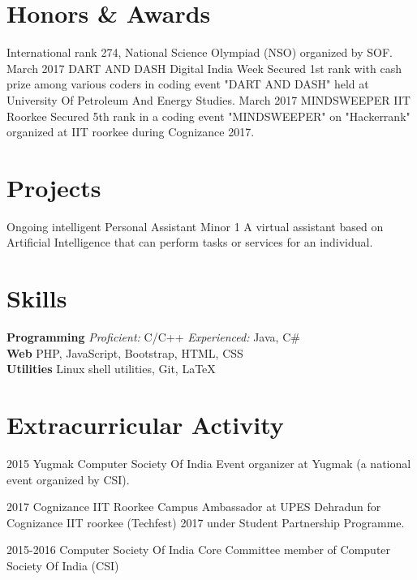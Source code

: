 \documentclass[]{friggeri-cv}
\begin{document}
\section{Honors \& Awards}

\begin{entrylist}
  \entry
    {}
    {International rank 274, \normalfont National Science Olympiad (NSO) organized by SOF.}
    {}
    {}
  \entry
    {March 2017}
    {DART AND DASH}
    {Digital India Week}
    {Secured 1st rank with cash prize among various coders in coding event "DART AND DASH" held at University Of Petroleum And Energy Studies.}
  \entry
    {March 2017}
    {MINDSWEEPER}
    {IIT Roorkee}
    {Secured 5th rank in a coding event "MINDSWEEPER" on "Hackerrank" organized at IIT roorkee during Cognizance 2017.}
    
\end{entrylist}

\section{Projects}
\begin{entrylist}
  \entry
    {Ongoing}
    {intelligent Personal Assistant}
    {Minor 1}
    {A virtual assistant based on Artificial Intelligence that can perform tasks or services for an individual. }  
\end{entrylist}

\section{Skills}
    
    \textbf{Programming}  
    \emph{\hspace{0.5cm}Proficient:} C/C++ \emph{\hspace{0.5cm} Experienced:} Java, C\# \\ 
    \textbf{\hspace{1.45cm} Web} 
    \hspace{0.4cm} PHP, JavaScript, Bootstrap, HTML, CSS  \\
    \textbf{\hspace{0.9cm} Utilities} 
    \hspace{0.4cm} Linux shell utilities, Git, \LaTeX

    
\section{Extracurricular Activity}
\begin{entrylist}
  \entry
    {2015}
    {Yugmak}
    {Computer Society Of India}
    {Event organizer at Yugmak (a national event organized by CSI).}
    
  \entry
    {2017}
    {Cognizance}
    {IIT Roorkee}
    {Campus Ambassador at UPES Dehradun for Cognizance IIT roorkee (Techfest) 2017 under Student Partnership Programme.}
    
  \entry
    {2015-2016}
    {Computer Society Of India}
    {}
    {Core Committee member of Computer Society Of India (CSI)}
    
  
\end{entrylist}
\end{document}
